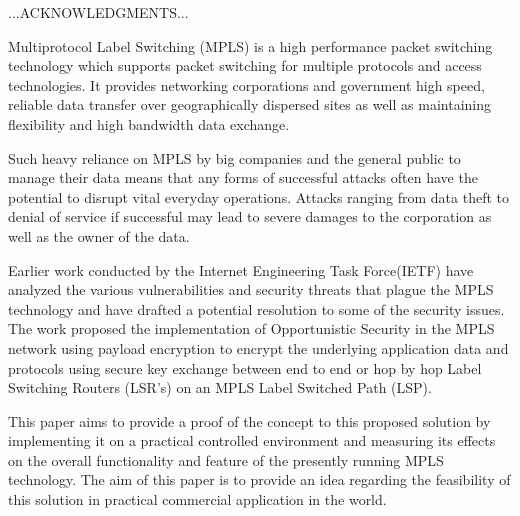 \documentclass[a4paper, 12pt, oneside]{report}         %
\begin{document}

\thesistitlepage                                  %

\thesisdeclarationpage                %

\thesispermissionpage                 %


\begin{thesisacknowledgments}                     %
...ACKNOWLEDGMENTS...                          %
\end{thesisacknowledgments}                       %

\begin{thesisabstract}                          %

Multiprotocol Label Switching (MPLS) is a high performance packet switching technology which supports packet switching for multiple protocols and access technologies. It provides networking corporations and government high speed, reliable data transfer over geographically dispersed sites as well as maintaining flexibility and high bandwidth data exchange.

Such heavy reliance on MPLS by big companies and the general public to manage their data means that any forms of successful attacks often have the potential to disrupt vital everyday operations. Attacks ranging from data theft to denial of service if successful may lead to severe damages to the corporation as well as the owner of the data.

Earlier work conducted by the Internet Engineering Task Force(IETF) have analyzed the various vulnerabilities and security threats that plague the MPLS technology and have drafted a potential resolution to some of the security issues. The work proposed the implementation of Opportunistic Security in the MPLS network using payload encryption to encrypt the underlying application data and protocols using secure key exchange between end to end or hop by hop Label Switching Routers (LSR's) on an MPLS Label Switched Path (LSP).

This paper aims to provide a proof of the concept to this proposed solution by implementing it on a practical controlled environment and measuring its effects on the overall functionality and feature of the presently running MPLS technology. The aim of this paper is to provide an idea regarding the feasibility of this solution in practical commercial application in the world.  
\end{thesisabstract}
\end{document}
